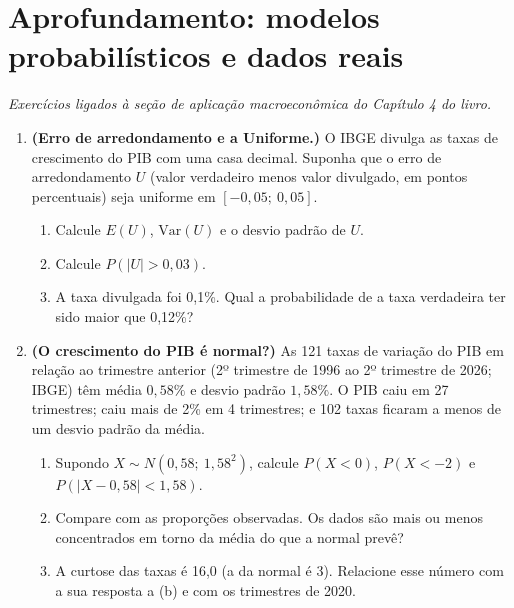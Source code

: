 \documentclass[11pt]{article}
\begin{document}
\bigskip
{}
\section*{Aprofundamento: modelos probabilísticos e dados reais}
\noindent\textit{Exercícios ligados à seção de aplicação macroeconômica do Capítulo 4 do livro.}

\begin{enumerate}[label=\textbf{A\arabic*.}, leftmargin=*]
\item \textbf{(Erro de arredondamento e a Uniforme.)} O IBGE divulga as taxas de crescimento do PIB com uma casa decimal. Suponha que o erro de
arredondamento $U$ (valor verdadeiro menos valor divulgado, em pontos percentuais) seja uniforme em $[-0{,}05;\ 0{,}05]$.
\begin{enumerate}[label=(\alph*)]
  \item Calcule $E(U)$, $\mathrm{Var}(U)$ e o desvio padrão de $U$.
  \item Calcule $P(|U| > 0{,}03)$.
  \item A taxa divulgada foi 0,1\%. Qual a probabilidade de a taxa verdadeira ter sido maior que 0,12\%?
\end{enumerate}

\item \textbf{(O crescimento do PIB é normal?)} As 121 taxas de variação do PIB em relação ao trimestre anterior (2º trimestre de 1996 ao 2º trimestre de 2026;
IBGE) têm média $0{,}58\%$ e desvio padrão $1{,}58\%$. O PIB caiu em 27 trimestres; caiu mais de 2\% em 4 trimestres; e 102 taxas ficaram a menos de um desvio padrão da média.
\begin{enumerate}[label=(\alph*)]
  \item Supondo $X \sim N(0{,}58;\ 1{,}58^2)$, calcule $P(X < 0)$, $P(X < -2)$ e $P(|X - 0{,}58| < 1{,}58)$.
  \item Compare com as proporções observadas. Os dados são mais ou menos concentrados em torno da média do que a normal prevê?
  \item A curtose das taxas é 16,0 (a da normal é 3). Relacione esse número com a sua resposta a (b) e com os trimestres de 2020.
\end{enumerate}

\end{enumerate}
\end{document}
